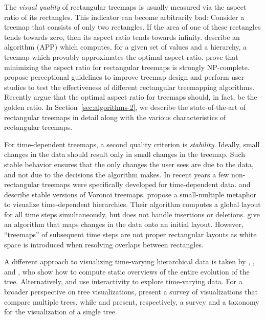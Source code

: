 The \emph{visual quality} of rectangular treemaps is usually measured via the aspect ratio of its rectangles. This indicator can become arbitrarily bad: Consider a treemap that consists of only two rectangles. If the area of one of these rectangles tends towards zero, then its aspect ratio tends towards infinity. \cite{nagamochi07} describe an algorithm (APP) which computes, for a given set of values and a hierarchy, a treemap which provably approximates the optimal aspect ratio. \cite{deberg14} prove that minimizing the aspect ratio for rectangular treemaps is strongly NP-complete. ~\cite{Kong2010} propose perceptional guidelines to improve treemap design and \cite{Zhou2017} perform user studies to test the effectiveness of different rectangular treemapping algorithms. Recently \cite{lu2017golden} argue that the optimal aspect ratio for treemaps should, in fact, be the golden ratio. In Section~\ref{sec:algorithms-2}, we describe the state-of-the-art of rectangular treemaps in detail along with the various characteristics of rectangular treemaps.

For time-dependent treemaps, a second quality criterion is \emph{stability}. Ideally, small changes in the data should result only in small changes in the treemap. Such stable behavior ensures that the only changes the user sees are due to the data, and not due to the decisions the algorithm makes.
%
In recent years a few non-rectangular treemaps were specifically developed for time-dependent data. \cite{hahn10} and \cite{hees17} describe stable versions of Voronoi treemaps. \cite{Chen2017} propose a small-multiple metaphor to visualize time-dependent hierarchies. Their algorithm computes a global layout for all time steps simultaneously, but does not handle insertions or deletions. \cite{Scheibel2018} give an algorithm that maps changes in the data onto an initial layout. However, ``treemaps'' of subsequent time steps are not proper rectangular layouts as white space is introduced when resolving overlaps between rectangles.
%

A different approach to visualizing time-varying hierarchical data is taken by 
\cite{lukasczyk2017nested}, \cite{kopp2019temporal}, and \cite{li19}, who show how to compute static overviews of the entire evolution of the tree. Alternatively, \cite{StemView} and \cite{TimeTree} use interactivity to explore time-varying data. 
For a broader perspective on tree visualizations, \cite{graham10} present a survey of visualizations that compare multiple trees, while \cite{schulz11_treesurvey} and \cite{scheibel20} present, respectively, a survey and a taxonomy for the visualization of a single tree. 

